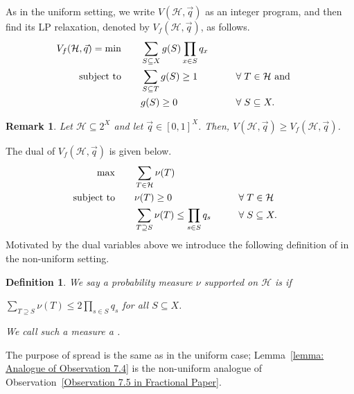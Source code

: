 \documentclass[12pt]{article}
\newtheorem*{definition*}{Definition}
\newtheorem*{remark*}{Remark}
\begin{document}
As in the uniform setting, we  write $V(\mathcal{H}, \vec{q})$ as an integer program, and then find its LP relaxation, denoted by $V_f(\mathcal{H},\vec{q})$, as follows.
\begin{alignat*}{7}
    V_f(\mathcal{H},\vec{q}) 
    = \min& &&\displaystyle\sum\limits_{S\subseteq X} g(S)\prod\limits_{x\in S} q_x
    \\
    \text{subject to}&\quad &&\sum\limits_{S\subseteq T} g(S)\geq 1 &&\hspace{3mm}&&\forall\hspace{1mm}  T\in\mathcal{H}\text{ and }
    \\
    &&& g(S)\geq 0 &&\hspace{3mm}&&\forall\hspace{1mm} S\subseteq X.
\end{alignat*}

\begin{remark*}
\normalfont
Let $\mathcal{H}\subseteq 2^X$ and let $\vec{q}\in [0,1]^X$. Then, $V(\mathcal{H},\vec{q})\geq V_f(\mathcal{H},\vec{q})$.
\end{remark*}

The dual of $V_f(\mathcal{H},\vec{q})$ is given below.
\begin{alignat*}{7}
    \max& &&\displaystyle\sum\limits_{T\in\mathcal{H}} \nu(T)
    \\
    \text{subject to}&\quad &&\nu(T)\geq 0 &&\hspace{3mm}&&\forall\hspace{1mm}  T\in\mathcal{H}
    \\ 
    & &&\sum\limits_{T\supseteq S} \nu(T)\leq\prod\limits_{s\in S} q_s &&\hspace{3mm}&&\forall\hspace{1mm} S\subseteq X.
\end{alignat*}
Motivated by the dual variables above we introduce the following definition of  in the non-uniform setting.

\begin{definition*}
We say a probability measure $\nu$ supported on $\mathcal{H}$ is   if
\begin{center}
    $\displaystyle\sum \limits_{T\supseteq S} \nu(T) \leq 2\prod\limits_{s\in S} q_s$ \quad for all $S\subseteq X$.  
\end{center}
We call such a measure a .
\end{definition*}

The purpose of spread is the same as in the uniform case; Lemma~\ref{lemma: Analogue of Observation 7.4} is the non-uniform analogue of Observation~\ref{Observation 7.5 in Fractional Paper}.
\end{document}
